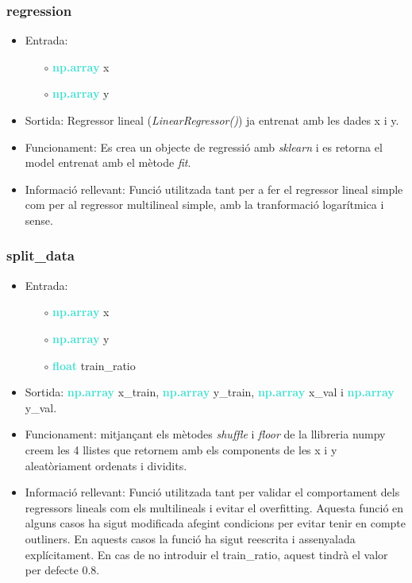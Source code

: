 \documentclass[a4paper, 11pt]{article}
\begin{document}
\subsubsection{regression}
\begin{itemize}
    \item Entrada:
    \begin{itemize}
        \item [$\circ$] \textbf{\textcolor{Turquoise}{np.array}} x
        \item [$\circ$] \textbf{\textcolor{Turquoise}{np.array}} y
    \end{itemize}
    \item Sortida: Regressor lineal (\textit{LinearRegressor()}) ja entrenat amb les dades x i y.
    \item Funcionament: Es crea un objecte de regressió amb \textit{sklearn} i es retorna el model entrenat amb el mètode \textit{fit}.
    \item Informació rellevant: Funció utilitzada tant per a fer el regressor lineal simple com per al regressor multilineal simple, amb la tranformació logarítmica i sense. \label{regression}
\end{itemize}

\subsubsection{split\_data}
\begin{itemize}
    \item Entrada:
    \begin{itemize}
        \item [$\circ$] \textbf{\textcolor{Turquoise}{np.array}} x
        \item [$\circ$] \textbf{\textcolor{Turquoise}{np.array}} y
        \item [$\circ$] \textbf{\textcolor{Turquoise}{float}} train\_ratio
    \end{itemize}
    \item Sortida:  \textbf{\textcolor{Turquoise}{np.array}} x\_train,  \textbf{\textcolor{Turquoise}{np.array}} y\_train,  \textbf{\textcolor{Turquoise}{np.array}} x\_val i  \textbf{\textcolor{Turquoise}{np.array}} y\_val.
    \item Funcionament: mitjançant els mètodes \textit{shuffle} i \textit{floor} de la llibreria numpy creem les 4 llistes que retornem amb els components de les x i y aleatòriament ordenats i dividits.
    \item Informació rellevant: Funció utilitzada tant per validar el comportament dels regressors lineals com els multilineals i evitar el overfitting. Aquesta funció en alguns casos ha sigut modificada afegint condicions per evitar tenir en compte outliners. En aquests casos la funció ha sigut reescrita i assenyalada explícitament. En cas de no introduir el train\_ratio, aquest tindrà el valor per defecte $0.8$. \label{split_data}
\end{itemize}
\end{document}
